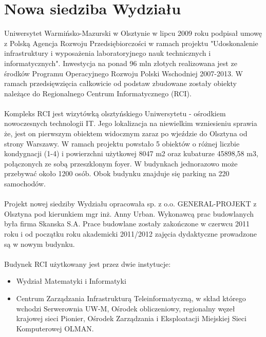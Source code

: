 \documentclass[a4paper,12pt]{article}
\begin{document}
\section{Nowa siedziba Wydziału}
Uniwersytet Warmińsko-Mazurski w Olsztynie w lipcu 2009 roku podpisał umowę z Polską Agencja Rozwoju
Przedsiębiorczości w ramach projektu "Udoskonalenie infrastruktury i wyposażenia laboratoryjnego nauk
technicznych i informatycznych". Inwestycja na ponad 96 mln złotych realizowana jest ze środków Programu
Operacyjnego Rozwoju Polski Wschodniej 2007-2013. W ramach przedsięwzięcia całkowicie od podstaw
zbudowane zostały obiekty należące do Regionalnego Centrum Informatycznego (RCI).\\\\
Kompleks RCI jest wizytówką olsztyńskiego Uniwersytetu - ośrodkiem nowoczesnych technologii IT. Jego
lokalizacja na niewielkim wzniesieniu sprawia że, jest on pierwszym obiektem widocznym zaraz po wjeździe
do Olsztyna od strony Warszawy. W ramach projektu powstało 5 obiektów o różnej liczbie kondygnacji (1-4) i
powierzchni użytkowej 8047 m2 oraz kubaturze 45898,58 m3, połączonych ze sobą przeszklonym foyer. W
budynkach jednorazowo może przebywać około 1200 osób. Obok budynku znajduje się parking na 220
samochodów.\\\\
Projekt nowej siedziby Wydziału opracowała sp. z o.o. GENERAL-PROJEKT z Olsztyna pod kierunkiem mgr
inż. Anny Urban. Wykonawcą prac budowlanych była firma Skanska S.A. Prace budowlane zostały
zakończone w czerwcu 2011 roku i od początku roku akademicki 2011/2012 zajęcia dydaktyczne prowadzone
są w nowym budynku.\\\\
Budynek RCI użytkowany jest przez dwie instytucje:
\begin{itemize}
\item Wydział Matematyki i Informatyki
\item {Centrum Zarządzania Infrastrukturą Teleinformatyczną, w skład którego wchodzi Serwerownia UW-M,
Ośrodek obliczeniowy, regionalny węzeł krajowej sieci Pionier, Ośrodek Zarządzania i Eksploatacji
Miejskiej Sieci Komputerowej OLMAN.}
\end{itemize}
\end{document}

